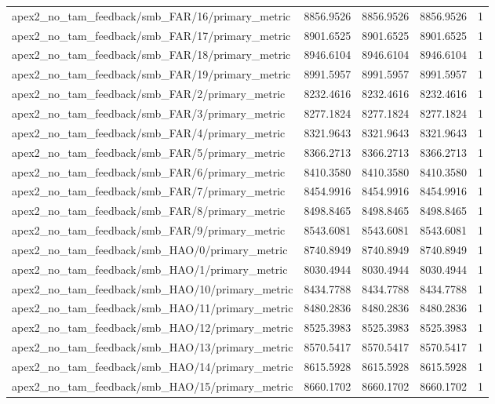 \begin{table}[h]
\begin{tabular}{lrrrr}
apex2_no_tam_feedback/smb_FAR/16/primary_metric & 8856.9526 & 8856.9526 & 8856.9526 & 1 \\
apex2_no_tam_feedback/smb_FAR/17/primary_metric & 8901.6525 & 8901.6525 & 8901.6525 & 1 \\
apex2_no_tam_feedback/smb_FAR/18/primary_metric & 8946.6104 & 8946.6104 & 8946.6104 & 1 \\
apex2_no_tam_feedback/smb_FAR/19/primary_metric & 8991.5957 & 8991.5957 & 8991.5957 & 1 \\
apex2_no_tam_feedback/smb_FAR/2/primary_metric & 8232.4616 & 8232.4616 & 8232.4616 & 1 \\
apex2_no_tam_feedback/smb_FAR/3/primary_metric & 8277.1824 & 8277.1824 & 8277.1824 & 1 \\
apex2_no_tam_feedback/smb_FAR/4/primary_metric & 8321.9643 & 8321.9643 & 8321.9643 & 1 \\
apex2_no_tam_feedback/smb_FAR/5/primary_metric & 8366.2713 & 8366.2713 & 8366.2713 & 1 \\
apex2_no_tam_feedback/smb_FAR/6/primary_metric & 8410.3580 & 8410.3580 & 8410.3580 & 1 \\
apex2_no_tam_feedback/smb_FAR/7/primary_metric & 8454.9916 & 8454.9916 & 8454.9916 & 1 \\
apex2_no_tam_feedback/smb_FAR/8/primary_metric & 8498.8465 & 8498.8465 & 8498.8465 & 1 \\
apex2_no_tam_feedback/smb_FAR/9/primary_metric & 8543.6081 & 8543.6081 & 8543.6081 & 1 \\
apex2_no_tam_feedback/smb_HAO/0/primary_metric & 8740.8949 & 8740.8949 & 8740.8949 & 1 \\
apex2_no_tam_feedback/smb_HAO/1/primary_metric & 8030.4944 & 8030.4944 & 8030.4944 & 1 \\
apex2_no_tam_feedback/smb_HAO/10/primary_metric & 8434.7788 & 8434.7788 & 8434.7788 & 1 \\
apex2_no_tam_feedback/smb_HAO/11/primary_metric & 8480.2836 & 8480.2836 & 8480.2836 & 1 \\
apex2_no_tam_feedback/smb_HAO/12/primary_metric & 8525.3983 & 8525.3983 & 8525.3983 & 1 \\
apex2_no_tam_feedback/smb_HAO/13/primary_metric & 8570.5417 & 8570.5417 & 8570.5417 & 1 \\
apex2_no_tam_feedback/smb_HAO/14/primary_metric & 8615.5928 & 8615.5928 & 8615.5928 & 1 \\
apex2_no_tam_feedback/smb_HAO/15/primary_metric & 8660.1702 & 8660.1702 & 8660.1702 & 1 \\

\end{tabular}
\end{table}
